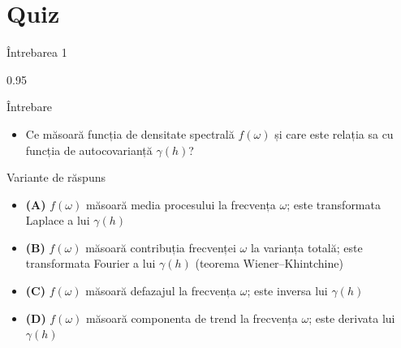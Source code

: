 \documentclass[9pt, aspectratio=169, t]{beamer}
\begin{document}
\section{Quiz}

\begin{frame}{Întrebarea 1}
    \begin{cminipage}{0.95\textwidth}
    \begin{alertblock}{Întrebare}
        \begin{itemize}\setlength{\itemsep}{0pt}
            \item Ce măsoară funcția de densitate spectrală $f(\omega)$ și care este relația sa cu funcția de autocovarianță $\gamma(h)$?
        \end{itemize}
    \end{alertblock}

    \vspace{0.3cm}

    \begin{block}{Variante de răspuns}
        \begin{itemize}\setlength{\itemsep}{2pt}
            \item \textcolor{MainBlue}{\textbf{(A)}} $f(\omega)$ măsoară media procesului la frecvența $\omega$; este transformata Laplace a lui $\gamma(h)$
            \item \textcolor{MainBlue}{\textbf{(B)}} $f(\omega)$ măsoară contribuția frecvenței $\omega$ la varianța totală; este transformata Fourier a lui $\gamma(h)$ (teorema Wiener--Khintchine)
            \item \textcolor{MainBlue}{\textbf{(C)}} $f(\omega)$ măsoară defazajul la frecvența $\omega$; este inversa lui $\gamma(h)$
            \item \textcolor{MainBlue}{\textbf{(D)}} $f(\omega)$ măsoară componenta de trend la frecvența $\omega$; este derivata lui $\gamma(h)$
        \end{itemize}
    \end{block}
    \end{cminipage}
\end{frame}
\end{document}
